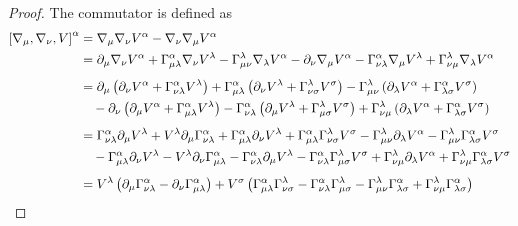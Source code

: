 \documentclass[11pt]{article}
\begin{document}
\begin{proof}
	The commutator is defined as
	\begin{equation*}
		\begin{aligned}
      \comm{\nabla_{\mu}, \nabla_{\nu}}V^{\alpha} &= \nabla_{\mu}\nabla_{\nu}V^{\alpha} - \nabla_{\nu}\nabla_{\mu}V^{\alpha} \\
                               &= \partial_{\mu}\nabla_{\nu}V^{\alpha} + \Gamma_{\mu\lambda}^{\alpha}\nabla_{\nu}V^{\lambda} - \Gamma_{\mu\nu}^{\lambda}\nabla_{\lambda}V^{\alpha}
                                 - \partial_{\nu}\nabla_{\mu}V^{\alpha} - \Gamma_{\nu\lambda}^{\alpha}\nabla_{\mu}V^{\lambda} + \Gamma_{\nu\mu}^{\lambda}\nabla_{\lambda}V^{\alpha} \\[1ex]
                               &= \partial_{\mu}\left( \partial_{\nu}V^{\alpha} + \Gamma_{\nu\lambda}^{\alpha}V^{\lambda} \right) + \Gamma_{\mu\lambda}^{\alpha}\left( \partial_{\nu}V^{\lambda} + \Gamma_{\nu\sigma}^{\lambda}V^{\sigma} \right) - \Gamma_{\mu\nu}^{\lambda}\left( \partial_{\lambda}V^{\alpha} + \Gamma_{\lambda\sigma}^{\alpha}V^{\sigma} \right) \\
                               &\quad - \partial_{\nu}\left( \partial_{\mu}V^{\alpha} + \Gamma_{\mu\lambda}^{\alpha}V^{\lambda} \right) - \Gamma_{\nu\lambda}^{\alpha}\left( \partial_{\mu}V^{\lambda} + \Gamma_{\mu\sigma}^{\lambda}V^{\sigma} \right) + \Gamma_{\nu\mu}^{\lambda}\left( \partial_{\lambda}V^{\alpha} + \Gamma_{\lambda\sigma}^{\alpha}V^{\sigma} \right) \\[1ex]
                               &= \Gamma_{\nu\lambda}^{\alpha}\partial_{\mu}V^{\lambda} + V^{\lambda}\partial_{\mu}\Gamma_{\nu\lambda}^{\alpha} + \Gamma_{\mu\lambda}^{\alpha}\partial_{\nu}V^{\lambda} + \Gamma_{\mu\lambda}^{\alpha}\Gamma_{\nu\sigma}^{\lambda}V^{\sigma} - \Gamma_{\mu\nu}^{\lambda}\partial_{\lambda}V^{\alpha} - \Gamma_{\mu\nu}^{\lambda}\Gamma_{\lambda\sigma}^{\alpha}V^{\sigma} \\
                               &\quad -\Gamma_{\mu\lambda}^{\alpha}\partial_{\nu}V^{\lambda} - V^{\lambda}\partial_{\nu}\Gamma_{\mu\lambda}^{\alpha} - \Gamma_{\nu\lambda}^{\alpha}\partial_{\mu}V^{\lambda} - \Gamma_{\nu\lambda}^{\alpha}\Gamma_{\mu\sigma}^{\lambda}V^{\sigma} + \Gamma_{\nu\mu}^{\lambda}\partial_{\lambda}V^{\alpha} + \Gamma_{\nu\mu}^{\lambda}\Gamma_{\lambda\sigma}^{\alpha}V^{\sigma} \\[1ex]
                               &= V^{\lambda}\left( \partial_{\mu}\Gamma_{\nu\lambda}^{\alpha} - \partial_{\nu}\Gamma_{\mu\lambda}^{\alpha} \right) + V^{\sigma} \left( \Gamma_{\mu\lambda}^{\alpha}\Gamma_{\nu\sigma}^{\lambda} - \Gamma_{\nu\lambda}^{\alpha}\Gamma_{\mu\sigma}^{\lambda} - \Gamma_{\mu\nu}^{\lambda}\Gamma_{\lambda\sigma}^{\alpha} + \Gamma_{\nu\mu}^{\lambda}\Gamma_{\lambda\sigma}^{\alpha} \right) \\

\end{aligned}
\end{equation*}
\end{proof}
\end{document}
